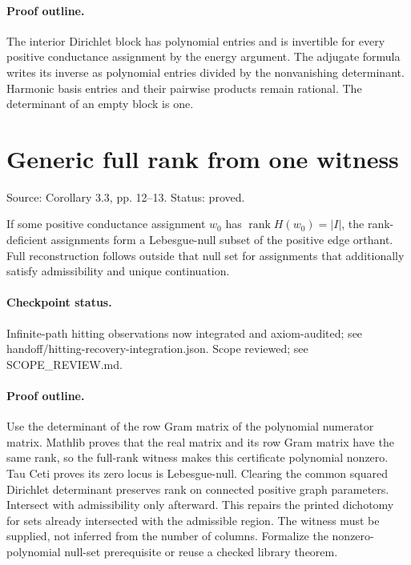 \paragraph{Proof outline.}

The interior Dirichlet block has polynomial entries and is invertible for every positive conductance assignment by the energy argument. The adjugate formula writes its inverse as polynomial entries divided by the nonvanishing determinant. Harmonic basis entries and their pairwise products remain rational. The determinant of an empty block is one.
\nodebreak
\section{Generic full rank from one witness}
Source: Corollary 3.3, pp. 12–13. Status: proved.
\begin{corollary}\label{generic-rank}

If some positive conductance assignment $w_0$ has $\operatorname{rank}H(w_0)=|I|$, the rank-deficient assignments form a Lebesgue-null subset of the positive edge orthant. Full reconstruction follows outside that null set for assignments that additionally satisfy admissibility and unique continuation.


\paragraph{Checkpoint status.}
Infinite-path hitting observations now integrated and axiom-audited; see handoff/hitting-recovery-integration.json. Scope reviewed; see SCOPE\_REVIEW.md.
\end{corollary}
\paragraph{Proof outline.}

Use the determinant of the row Gram matrix of the polynomial numerator matrix. Mathlib proves that the real matrix and its row Gram matrix have the same rank, so the full-rank witness makes this certificate polynomial nonzero. Tau Ceti proves its zero locus is Lebesgue-null. Clearing the common squared Dirichlet determinant preserves rank on connected positive graph parameters. Intersect with admissibility only afterward. This repairs the printed dichotomy for sets already intersected with the admissible region. The witness must be supplied, not inferred from the number of columns. Formalize the nonzero-polynomial null-set prerequisite or reuse a checked library theorem.
\nodebreak
